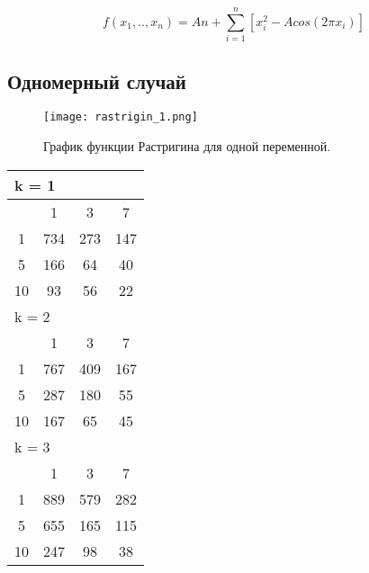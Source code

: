 \begin{equation}
\label{rastrigin_eq}
f(x_1, .., x_n) = An + \sum\limits_{i = 1}^n\left[ x_i^2 - Acos\left(2 \pi x_i \right)\right]
\end{equation}

\subsection{Одномерный случай}

\begin{figure}
    \centering
    \texttt{[image: rastrigin\_1.png]}
    \caption{График функции Растригина для одной переменной.}
    \label{rastrigin_plot}
\end{figure}

\begin{table}
\begin{tabular}{|*4{c|}}
\hline
\multicolumn{4}{|l|}{k = 1} \\
\hline
\diagbox{$\mu$}{$\lambda$} & \multicolumn{1}{c|}{1} & \multicolumn{1}{c|}{3} & \multicolumn{1}{c|}{7} \\
\hline
1 & 734 & 273 & 147 \\
\hline
5 & 166 & 64 & 40 \\
\hline
10 & 93 & 56 & 22 \\
\hline
\multicolumn{4}{|l|}{k = 2} \\
\hline
\diagbox{$\mu$}{$\lambda$} & \multicolumn{1}{c|}{1} & \multicolumn{1}{c|}{3} & \multicolumn{1}{c|}{7} \\
\hline
1 & 767 & 409 & 167 \\
\hline
5 & 287 & 180 & 55 \\
\hline
10 & 167 & 65 & 45 \\
\hline
\multicolumn{4}{|l|}{k = 3} \\
\hline
\diagbox{$\mu$}{$\lambda$} & \multicolumn{1}{c|}{1} & \multicolumn{1}{c|}{3} & \multicolumn{1}{c|}{7} \\
\hline
1 & 889 & 579 & 282 \\
\hline
5 & 655 & 165 & 115 \\
\hline
10 & 247 & 98 & 38 \\
\hline
\end{tabular}
\end{table}


